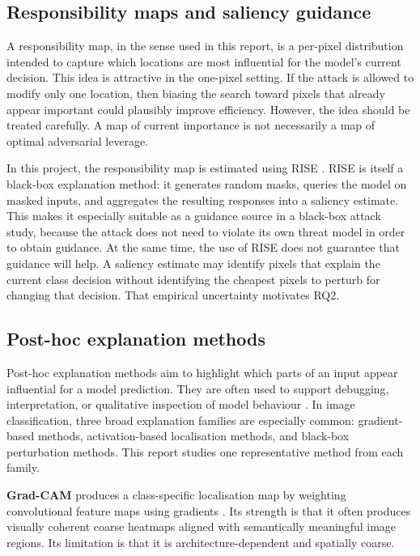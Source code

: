 \subsection{Responsibility maps and saliency guidance}
A responsibility map, in the sense used in this report, is a per-pixel distribution intended to capture which locations are most influential for the model's current decision.
This idea is attractive in the one-pixel setting.
If the attack is allowed to modify only one location, then biasing the search toward pixels that already appear important could plausibly improve efficiency.
However, the idea should be treated carefully.
A map of current importance is not necessarily a map of optimal adversarial leverage.

In this project, the responsibility map is estimated using RISE \cite{petsiuk2018rise}.
RISE is itself a black-box explanation method: it generates random masks, queries the model on masked inputs, and aggregates the resulting responses into a saliency estimate.
This makes it especially suitable as a guidance source in a black-box attack study, because the attack does not need to violate its own threat model in order to obtain guidance.
At the same time, the use of RISE does not guarantee that guidance will help.
A saliency estimate may identify pixels that explain the current class decision without identifying the cheapest pixels to perturb for changing that decision.
That empirical uncertainty motivates RQ2.

\subsection{Post-hoc explanation methods}
Post-hoc explanation methods aim to highlight which parts of an input appear influential for a model prediction.
They are often used to support debugging, interpretation, or qualitative inspection of model behaviour \cite{ribeiro2016lime}.
In image classification, three broad explanation families are especially common: gradient-based methods, activation-based localisation methods, and black-box perturbation methods.
This report studies one representative method from each family.

\textbf{Grad-CAM} produces a class-specific localisation map by weighting convolutional feature maps using gradients \cite{selvaraju2017gradcam}.
Its strength is that it often produces visually coherent coarse heatmaps aligned with semantically meaningful image regions.
Its limitation is that it is architecture-dependent and spatially coarse.

